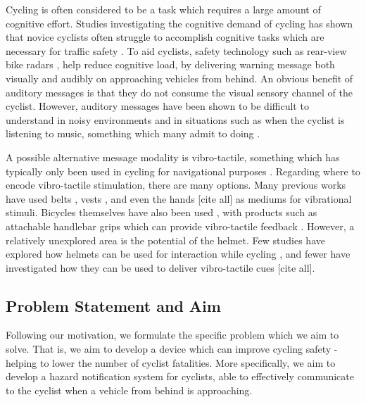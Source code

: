 \documentclass{interim}
\begin{document}
Cycling is often considered to be a task which requires a large amount of cognitive effort. Studies investigating the cognitive demand of cycling has shown that novice cyclists often struggle to accomplish cognitive tasks which are necessary for traffic safety \cite{https://doi.org/10.1002/acp.2350050205}. To aid cyclists, safety technology such as rear-view bike radars \cite{garminradar}, help reduce cognitive load, by delivering warning message both visually and audibly on approaching vehicles from behind. An obvious benefit of auditory messages is that they do not consume the visual sensory channel of the cyclist. However, auditory messages have been shown to be difficult to understand in noisy environments \cite{noisyenv} and in situations such as when the cyclist is listening to music, something which many admit to doing \cite{DEWAARD2011626}.

A possible alternative message modality is vibro-tactile, something which has typically only been used in cycling for navigational purposes \cite{10.1145/2371574.2371631, 10.1145/1613858.1613911}. Regarding where to encode vibro-tactile stimulation, there are many options. Many previous works have used belts \cite{10.1145/1613858.1613911, 10.1145/1463160.1463179, tsukada2004activebelt, 10.1145/2449396.2449450, 10.1145/1060581.1060585}, vests \cite{729547, 998954, van2000tactile}, and even the hands [cite all] as mediums for vibrational stimuli. Bicycles themselves have also been used \cite{10.1145/2371574.2371631, 10.1145/3290605.3300850}, with products such as attachable handlebar grips which can provide vibro-tactile feedback \cite{smartgrips}. However, a relatively unexplored area is the potential of the helmet. Few studies have explored how helmets can be used for interaction while cycling \cite{10.1145/2559206.2574803, 10.1145/1240866.1241027}, and fewer have investigated how they can be used to deliver vibro-tactile cues [cite all].

\subsection{Problem Statement and Aim}
Following our motivation, we formulate the specific problem which we aim to solve. That is, we aim to develop a device which can improve cycling safety - helping to lower the number of cyclist fatalities. More specifically, we aim to develop a hazard notification system for cyclists, able to effectively communicate to the cyclist when a vehicle from behind is approaching. 
\end{document}
